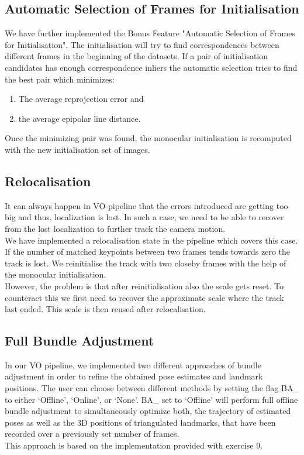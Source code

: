 \subsection{Automatic Selection of Frames for Initialisation}
We have further implemented the Bonus Feature "Automatic Selection of Frames for Initialisation". The initialisation will try to find correspondences between different frames in the beginning of the datasets. If a pair of initialisation candidates has enough correspondence inliers the automatic selection tries to find the best pair which minimizes:

\begin{enumerate}
\item The average reprojection error and 
\item the average epipolar line distance.
\end{enumerate}

Once the minimizing pair was found, the monocular initialisation is recomputed with the new initialisation set of images.

\subsection{Relocalisation}
It can always happen in VO-pipeline that the errors introduced are getting too big and thus, localization is lost. In such a case, we need to be able to recover from the lost localization to further track the camera motion. \\
We have implemented a relocalisation state in the pipeline which covers this case. If the number of matched keypoints between two frames tends towards zero the track is lost. We reinitialise the track with two closeby frames with the help of the monocular initialisation. \\
However, the problem is that after reinitialisation also the scale gets reset. To counteract this we first need to recover the approximate scale where the track last ended. This scale is then reused after relocalisation. 

\subsection{Full Bundle Adjustment}

In our VO pipeline, we implemented two different approaches of bundle adjustment in order to refine the obtained pose estimates and landmark positions. The user can choose between different methods by setting the flag BA\_ to either ‘Offline’, ‘Online’, or ‘None’. 
BA\_ set to ‘Offline’ will perform full offline bundle adjustment to simultaneously optimize both, the trajectory of estimated poses as well as the 3D positions of triangulated landmarks, that have been recorded over a previously set number of frames. \\
This approach is based on the implementation provided with exercise 9. 

